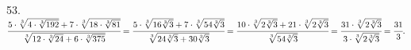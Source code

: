 53. $\cfrac{5\cdot\sqrt[3]{4\cdot\sqrt[3]{192}}+7\cdot\sqrt[3]{18\cdot\sqrt[3]{81}}}{\sqrt[3]{12\cdot
\sqrt[3]{24}+6\cdot\sqrt[3]{375}}}=\cfrac{5\cdot\sqrt[3]{16\sqrt[3]{3}}+7\cdot\sqrt[3]{54\sqrt[3]{3}}}{\sqrt[3]{24
\sqrt[3]{3}+30\sqrt[3]{3}}}=\cfrac{10\cdot\sqrt[3]{2\sqrt[3]{3}}+21\cdot\sqrt[3]{2\sqrt[3]{3}}}{\sqrt[3]{54
\sqrt[3]{3}}}=\cfrac{31\cdot\sqrt[3]{2\sqrt[3]{3}}}{3\cdot\sqrt[3]{2\sqrt[3]{3}}}=
\cfrac{31}{3}.$
\newpage
